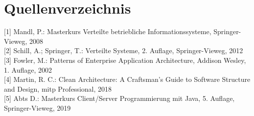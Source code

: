 \documentclass[10pt]{article}
\begin{document}
\section*{Quellenverzeichnis}
[1] Mandl, P.: Masterkurs Verteilte betriebliche Informationssysteme, Springer-Vieweg, 2008\\[0pt]
[2] Schill, A.; Springer, T.: Verteilte Systeme, 2. Auflage, Springer-Vieweg, 2012\\[0pt]
[3] Fowler, M.: Patterns of Enterprise Application Architecture, Addison Wesley, 1. Auflage, 2002\\[0pt]
[4] Martin, R. C.: Clean Architecture: A Craftsman's Guide to Software Structure and Design, mitp Professional, 2018\\[0pt]
[5] Abts D.: Masterkurs Client/Server Programmierung mit Java, 5. Auflage, Springer-Vieweg, 2019
\end{document}
